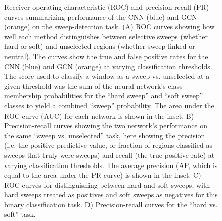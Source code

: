 \begin{figure}
    \centering
    \begin{center}
    \caption[Receiver operating characteristic (ROC) and precision-recall (PR) curves summarizing performance of the CNN and GCN on the sweep-detection task]{Receiver operating characteristic (ROC) and precision-recall (PR) curves summarizing performance of  the CNN (blue) and GCN (orange) on the sweep-detection task. (A) ROC curves showing how well each method distinguishes between selective sweeps (whether hard or soft) and unselected regions (whether sweep-linked or neutral). The curves show the true and false positive rates for the CNN (blue) and GCN (orange) at varying classification thresholds. The score used to classify a window as a sweep vs. unselected at a given threshold was the sum of the neural network’s class membership probabilities for the “hard sweep” and “soft sweep” classes to yield a combined “sweep” probability. The area under the ROC curve (AUC) for each network is shown in the inset. B) Precision-recall curves showing the two network’s performance on the same “sweep vs. unselected” task, here showing the precision (i.e. the positive predictive value, or fraction of regions classified as sweeps that truly were sweeps) and recall (the true positive rate) at varying classification thresholds. The average precision (AP, which is equal to the area under the PR curve) is shown in the inset. C) ROC curves for distinguishing between hard and soft sweeps, with hard sweeps treated as positives and soft sweeps as negatives for this binary classification task. D) Precision-recall curves for the “hard vs. soft” task.}
    \end{center}
\end{figure}

